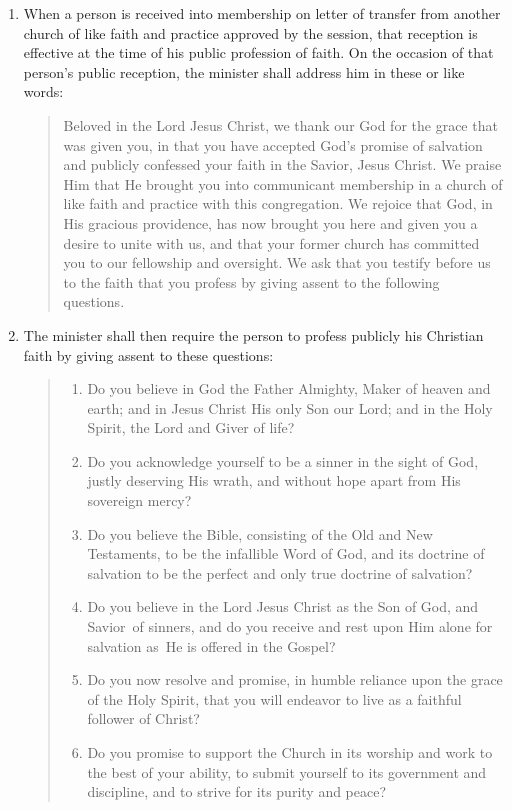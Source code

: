 \documentclass[
]{book}
\providecommand{\tightlist}{%
  \setlength{\itemsep}{0pt}\setlength{\parskip}{0pt}}
\begin{document}
\begin{enumerate}
\def\labelenumi{\arabic{enumi}.}
\item
  \protect\hypertarget{64}{\href{}{}}When a person is received into membership on letter of transfer from another church of like faith and practice approved by the session, that reception is effective at the time of his public profession of faith. On the occasion of that person's public reception, the minister shall address him in these or like words:

  \begin{quote}
  Beloved in the Lord Jesus Christ, we thank our God for the grace that was given you, in that you have accepted God's promise of salvation and publicly confessed your faith in the Savior, Jesus Christ. We praise Him that He brought you into communicant membership in a church of like faith and practice with this congregation. We rejoice that God, in His gracious providence, has now brought you here and given you a desire to unite with us, and that your former church has committed you to our fellowship and oversight. We ask that you testify before us to the faith that you profess by giving assent to the following questions.
  \end{quote}
\item
  The minister shall then require the person to profess publicly his Christian faith by giving assent to these questions:

  \begin{quote}
  \begin{enumerate}
  \def\labelenumii{(\arabic{enumii})}
  \tightlist
  \item
    Do you believe in God the Father Almighty, Maker of heaven and earth; and in Jesus Christ His only Son our Lord; and in the Holy Spirit, the Lord and Giver of life?
  \item
    Do you acknowledge yourself to be a sinner in the sight of God, justly deserving His wrath, and without hope apart from His sovereign mercy?
  \item
    Do you believe the Bible, consisting of the Old and New Testaments, to be the infallible Word of God, and its doctrine of salvation to be the perfect and only true doctrine of salvation?
  \item
    Do you believe in the Lord Jesus Christ as the Son of God, and Savior~of sinners, and do you receive and rest upon Him alone for salvation as~He is offered in the Gospel?
  \item
    Do you now resolve and promise, in humble reliance upon the grace of the Holy Spirit, that you will endeavor to live as a faithful follower of Christ?
  \item
    Do you promise to support the Church in its worship and work to the best of your ability, to submit yourself to its government and discipline, and to strive for its purity and peace?
  \end{enumerate}
  \end{quote}


\end{enumerate}
\end{document}
